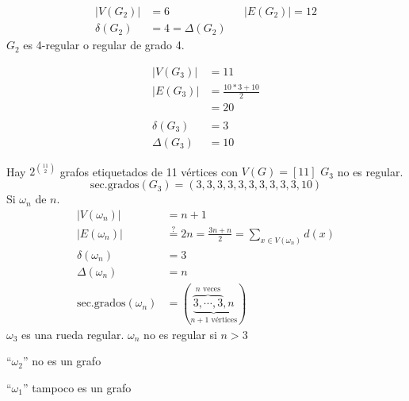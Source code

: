 \documentclass[../main.tex]{subfiles}
\begin{document}
\begin{figure}[H]
	\centering
	
\end{figure}

\begin{align*}
	|V(G_2)|&=6 && |E(G_2)|=12\\
	\delta(G_2)&=4=\Delta(G_2)
\end{align*}
$G_2$ es 4-regular o regular de grado 4.

\begin{figure}[H]
	\centering
	
\end{figure}

\begin{align*}
	|V(G_3)|&= 11 \\
	|E(G_3)|&= \frac{10*3+10}{2} \\
	&= 20\\
	\\
	\delta(G_3) &= 3\\
	\Delta(G_3) &= 10
\end{align*}

Hay $2^\binom{11}{2}$ grafos etiquetados de 11 vértices con $V(G)=[11]$
$G_3$ no es regular.
\[
	\text{sec.grados}(G_3) = (3,3,3,3,3,3,3,3,3,3,10)
\]
Si $\omega_n$ de $n$.
\begin{align*}
	|V(\omega_n)|&=n+1\\
	|E(\omega_n)|&
	\overset
	{
		?
	}
	{
		=
	}
	2n
	=
	\frac{3n+n}{2}
	=\sum_{x\in V(\omega_n)} d(x)
	\\
	\delta(\omega_n)&=3\\
	\Delta(\omega_n)&=n\\
	\text{sec.grados}(\omega_n) &=
	(
		\underbrace
		{
			\overbrace
			{
				3,\cdots,3
			}^
			{
				n\text{ veces}
			}
			,n
		}_
		{
			n+1\text{ vértices}
		}
	)
\end{align*}
$\omega_3$ es una rueda regular.
$\omega_n$ no es regular si $n > 3$

\begin{figure}[H]
	\centering
	
\end{figure}

``$\omega_2$'' no es un grafo

\begin{figure}[H]
	\centering
	
\end{figure}

``$\omega_1$'' tampoco es un grafo
\end{document}
